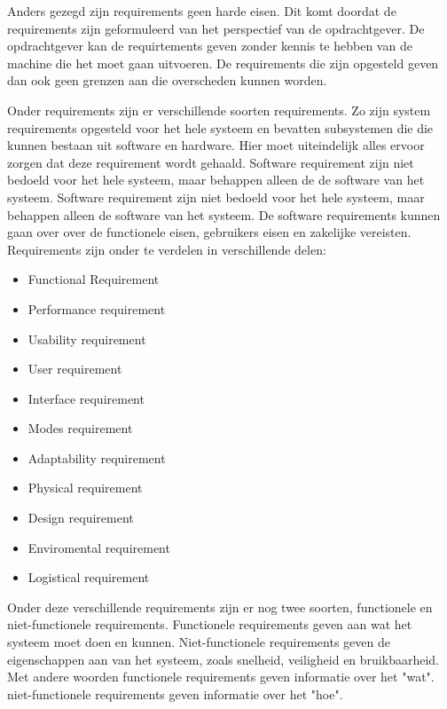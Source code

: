 \documentclass{article}%
\begin{document}
Anders gezegd zijn requirements geen harde eisen. Dit komt doordat de requirements zijn geformuleerd van het perspectief van de opdrachtgever. De opdrachtgever kan de requirtements geven zonder kennis te hebben van de machine die het moet gaan uitvoeren. De requirements die zijn opgesteld geven dan ook geen grenzen aan die overscheden kunnen worden.

Onder requirements zijn er verschillende soorten requirements. Zo zijn system requirements opgesteld voor het hele systeem en bevatten subsystemen die die kunnen bestaan uit software en hardware. Hier moet uiteindelijk alles ervoor zorgen dat deze requirement wordt gehaald. Software requirement zijn niet bedoeld voor het hele systeem, maar behappen alleen de de software van het systeem. Software requirement zijn niet bedoeld voor het hele systeem, maar behappen alleen de software van het systeem. De software requirements kunnen gaan over over de functionele eisen, gebruikers eisen en zakelijke vereisten.
Requirements zijn onder te verdelen in verschillende delen: 
\begin{multicols}{2}
\begin{itemize}
\item Functional Requirement
\item Performance requirement
\item Usability requirement
\item User requirement
\item Interface requirement
\item Modes requirement
\item Adaptability requirement
\item Physical requirement
\item Design requirement
\item Enviromental requirement
\item Logistical requirement
\end{itemize}
\end{multicols}

Onder deze verschillende requirements zijn er nog twee soorten, functionele en niet-functionele requirements. 
Functionele requirements geven aan wat het systeem moet doen en kunnen. Niet-functionele requirements geven de eigenschappen aan van het systeem, zoals snelheid, veiligheid en bruikbaarheid. Met andere woorden functionele requirements geven informatie over het "wat". niet-functionele requirements geven informatie over het "hoe".
\end{document}

